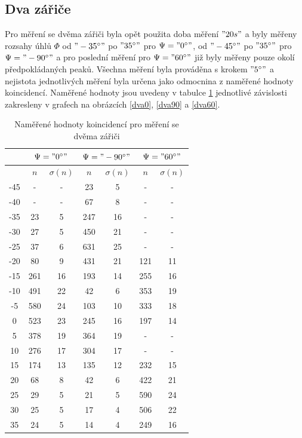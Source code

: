\documentclass[10pt,a4paper]{article}
\begin{document}
\subsection*{Dva zářiče}
Pro měření se dvěma zářiči byla opět použita doba měření $"20 s"$ a byly měřeny rozsahy úhlů $\Phi$ od $"-35^\circ"$ po $"35^\circ"$ pro $\Psi="0^\circ"$, od $"-45^\circ"$ po $"35^\circ"$ pro $\Psi="-90^\circ"$ a pro poslední měření pro $\Psi="60^\circ"$ již byly měřeny pouze okolí předpokládaných peaků. Všechna měření byla prováděna s krokem $"5^\circ"$ a nejistota jednotlivých měření byla určena jako odmocnina z naměřené hodnoty koincidencí. Naměřené hodnoty jsou uvedeny v tabulce \ref{dvazarice} jednotlivé závislosti zakresleny v grafech na obrázcích \ref{dva0}, \ref{dva90} a \ref{dva60}.
\begin{table}[h]
\centering
\caption{Naměřené hodnoty koincidencí pro měření se dvěma zářiči}
\label{dvazarice}
\begin{tabular}{|c|c|c|c|c|c|c|}
\hline
&\multicolumn{2}{c|}{$\Psi="0 ^\circ"$}&\multicolumn{2}{c|}{$\Psi="-90 ^\circ"$}&\multicolumn{2}{c|}{$\Psi="60 ^\circ"$}
\\
\hline
\popi{\Phi}{\dg}&$n$&$\sigma(n)$&$n$&$\sigma(n)$&$n$&$\sigma(n)$
\\
\hline
-45&-&-&23&5&-&-
\\
\hline
-40&-&-&67&8&-&-
\\
\hline
-35&23&5&247&16&-&-
\\
\hline
-30&27&5&450&21&-&-
\\
\hline
-25&37&6&631&25&-&-
\\
\hline
-20&80&9&431&21&121&11
\\
\hline
-15&261&16&193&14&255&16
\\
\hline
-10&491&22&42&6&353&19
\\
\hline
-5&580&24&103&10&333&18
\\
\hline
0&523&23&245&16&197&14
\\
\hline
5&378&19&364&19&-&-
\\
\hline
10&276&17&304&17&-&-
\\
\hline
15&174&13&135&12&232&15
\\
\hline
20&68&8&42&6&422&21
\\
\hline
25&29&5&21&5&590&24
\\
\hline
30&25&5&17&4&506&22
\\
\hline
35&24&5&14&4&249&16
\\
\hline
\end{tabular}
\end{table}
\end{document}
